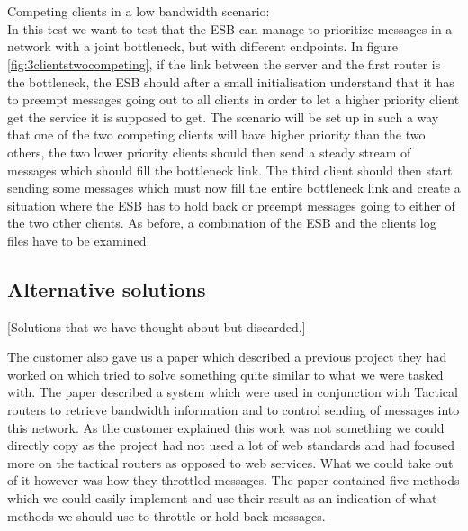 \\\\
Competing clients in a low bandwidth scenario:\\
    In this test we want to test that the ESB can manage to prioritize messages in a network with a joint bottleneck, but with different endpoints. In figure \ref{fig:3clientstwocompeting}, if the link between the server and the first router is the bottleneck, the ESB should after a small initialisation understand that it has to preempt messages going out to all clients in order to let a higher priority client get the service it is supposed to get. The scenario will be set up in such a way that one of the two competing clients will have higher priority than the two others, the two lower priority clients should then send a steady stream of messages which should fill the bottleneck link. The third client should then start sending some messages which must now fill the entire bottleneck link and create a situation where the ESB has to hold back or preempt messages going to either of the two other clients. As before, a combination of the ESB and the clients log files have to be examined.
           
    \subsection{Alternative solutions}\label{Alternative solutions} [Solutions that we have thought about but discarded.]

        The customer also gave us a paper\cite{soa-qos-pdf} which described a previous project they had worked on which tried to solve something quite similar to what we were tasked with. The paper described a system which were used in conjunction with Tactical routers to retrieve bandwidth information and to control sending of messages into this network. As the customer explained this work was not something we could directly copy as the project had not used a lot of web standards and had focused more on the tactical routers as opposed to web services. What we could take out of it however was how they throttled messages. The paper contained five methods which we could easily implement and use their result as an indication of what methods we should use to throttle or hold back messages.

